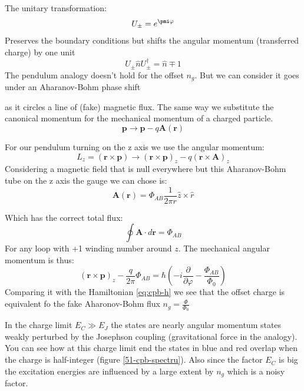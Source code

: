 \documentclass[12pt]{article}
\numberwithin{equation}{subsection}
\newcommand\ask[1]{
{%
}
}
\newcommand\page[1]{
{
}
}
\begin{document}
The unitary transformation:
\begin{equation}
    U_\pm = e^{\pmi\varphi}
\end{equation}
Preserves the boundary conditions but shifts the angular momentum (transferred charge) by one unit
\begin{equation}
    U_\pm\hat nU_\pm^\dagger = \hat n \mp 1
\end{equation}
The pendulum analogy doesn't hold for the offset $n_g$. But we can consider it goes under an Aharanov-Bohm phase shift
\ask{What is this phase shift?}
as it circles a line of (fake) magnetic flux. The same way we substitute the canonical momentum for the mechanical momentum of a charged particle.
\begin{equation}
    \mathbf p \rightarrow \mathbf p - q\mathbf A(\mathbf r)
\end{equation}

For our pendulum turning on the z axis we use the angular momentum:
\begin{equation}
    L_z = (\mathbf r \times \mathbf p) \rightarrow  (\mathbf r \times \mathbf p)_z - q (\mathbf r \times \mathbf A)_z
\end{equation}
Considering a magnetic field that is null everywhere but this Aharanov-Bohm tube on the z axis the gauge we can chose is:
\begin{equation}
    \mathbf A(\mathbf r)  = \Phi_{AB} \frac{1}{2\pi r} \hat z \times \hat r
\end{equation}
\page{52}
Which has the correct total flux:
\begin{equation}
    \oint \mathbf A \cdot d\mathbf r = \Phi_{AB}
\end{equation}
For any loop with +1 winding number around $z$. The mechanical angular momentum is thus:
\begin{equation}
     (\mathbf r \times \mathbf p)_z -\frac{q}{2\pi}\Phi_{AB}  = \hbar \left( -i\frac{\partial}{\partial \varphi} - \frac{\Phi_{AB}}{\Phi_0}\right )
\end{equation}
Comparing it with the Hamiltonian \ref{eq:cpb-h} we see that the offset charge is equivalent fo the fake Aharonov-Bohm flux $n_g = \frac{\Phi}{\Phi_0}$

In the charge limit $E_C \gg E_J$ the states are nearly angular momentum states weakly perturbed by the Josephson coupling (gravitational force in the analogy). You can see how at this charge limit end the states in blue and red overlap when the charge is half-integer (figure \ref{51-cpb-spectru}). Also since the factor $E_C$ is big the excitation energies are influenced by a large extent by $n_g$ which is a noisy factor.
\end{document}
